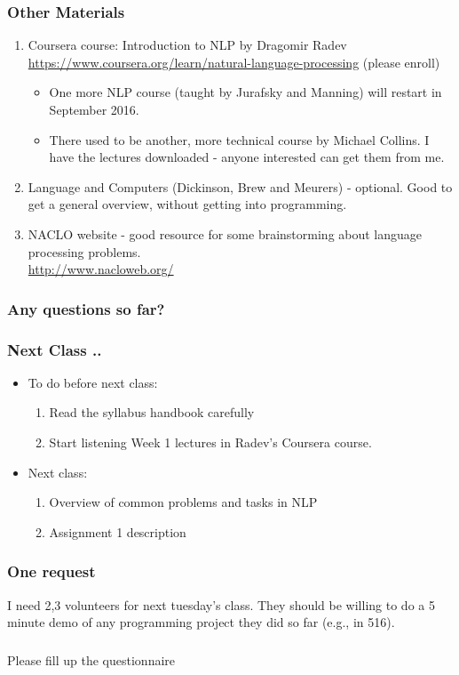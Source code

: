 \documentclass{beamer}
\begin{document}
\begin{frame}
\frametitle{Other Materials}
\begin{enumerate}
\item Coursera course: Introduction to NLP by Dragomir Radev \\ \url{https://www.coursera.org/learn/natural-language-processing} (please enroll)
\begin{itemize}
\item One more NLP course (taught by Jurafsky and Manning) will restart in September 2016.
\item There used to be another, more technical course by Michael Collins. I have the lectures downloaded - anyone interested can get them from me.
\end{itemize}
\item Language and Computers (Dickinson, Brew and Meurers) - optional. Good to get a general overview, without getting into programming.
\item NACLO website - good resource for some brainstorming about language processing problems. \\ \url{http://www.nacloweb.org/}
\end{enumerate}
\end{frame}

\begin{frame}
\frametitle{Any questions so far?}
\end{frame}

\begin{frame}
\frametitle{Next Class ..} 
\begin{itemize}
\item To do before next class:
\begin{enumerate}
\item Read the syllabus handbook carefully
\item Start listening Week 1 lectures in Radev's Coursera course.
\end{enumerate}
\item Next class: 
\begin{enumerate}
\item Overview of common problems and tasks in NLP
\item Assignment 1 description
\end{enumerate} 
\end{itemize}
\end{frame}

\begin{frame}
\frametitle{One request} 
I need 2,3 volunteers for next tuesday's class. They should be willing to do a 5 minute demo of any programming project they did so far (e.g., in 516).
\end{frame}

\begin{frame}
\frametitle{}
\begin{center}
\Large Please fill up the questionnaire
\end{center}
\end{frame}
\end{document}
